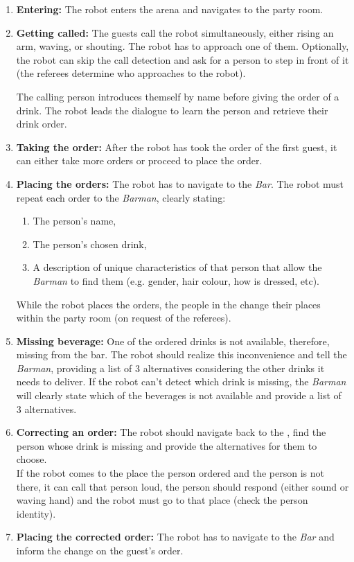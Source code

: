 \begin{enumerate}

	\item \textbf{Entering:} The robot enters the arena and navigates to the party room.
	\item \textbf{Getting called:} The guests call the robot simultaneously, either rising an arm, waving, or shouting. The robot has to approach one of them.
        Optionally, the robot can skip the call detection and ask for a person to step in front of it (the referees determine who approaches to the robot).

	The calling person introduces themself by name before giving the order of a drink.
	The robot leads the dialogue to learn the person and retrieve their drink order. \\


	\item \textbf{Taking the order:} After the robot has took the order of the first guest, it can either take more orders or proceed to place the order.

	\item \textbf{Placing the orders:} The robot has to navigate to the \textit{Bar}. The robot must repeat each order to the \textit{Barman}, clearly stating:
	\begin{enumerate}
		\item The person's name,
		\item The person's chosen drink,
		\item A description of unique characteristics of that person that allow the \textit{Barman} to find them (e.g. gender, hair colour, how is dressed, etc).
	\end{enumerate}

	While the robot places the orders, the people in the  change their places within the party room (on request of the referees).

	\item \textbf{Missing beverage:} One of the ordered drinks is not available, therefore, missing from the bar.
	The robot should realize this inconvenience and tell the \textit{Barman}, providing a list of 3 alternatives considering the other drinks it needs to deliver.
	If the robot can't detect which drink is missing, the \textit{Barman} will clearly state which of the beverages is not available and provide a list of 3 alternatives.

	\item \textbf{Correcting an order:} The robot should navigate back to the , find the person whose drink is missing and provide the alternatives for them to choose.\\

	If the robot comes to the place the person ordered and the person is not there, it can call that person loud, the person should respond (either sound or waving hand) and the robot must go to that place (check the person identity).

	\item \textbf{Placing the corrected order:} The robot has to navigate to the \textit{Bar} and inform the change on the guest's order.
\end{enumerate}

